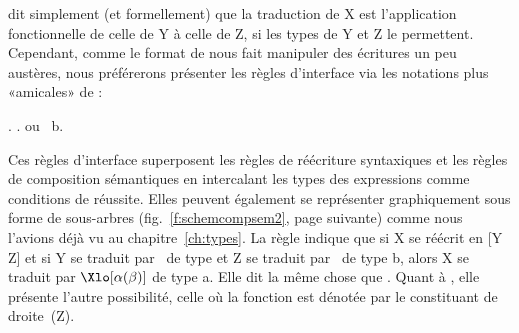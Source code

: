 {\Last} dit simplement (et formellement) que la traduction de X est l'application fonctionnelle de celle de Y à celle de Z, si les types de Y et Z le permettent.
Cependant, comme le format de {\Last} nous fait manipuler des écritures un peu austères, nous préférerons présenter les règles d'interface  via les  notations plus «amicales» de {\Next} :


\ex. \label{xRI1}
\a. 
\quad ou \
b.\hstrab[1.4em]


\sloppy

Ces règles d'interface superposent les règles de réécriture syntaxiques et les règles de composition sémantiques en intercalant les types des expressions comme conditions de réussite.  Elles peuvent également se représenter graphiquement sous forme de sous-arbres (fig.~\ref{f:schemcompsem2}, page suivante) comme nous l'avions déjà vu au chapitre~\ref{ch:types}.  La règle \Last[a]  indique que si X se réécrit en [Y Z] et si Y se traduit par \vrb\alpha\ de type  et Z se traduit par \vrb\beta\ de type \mtyp b, alors X se traduit par $\Xlo[\alpha(\beta)]$ de type \mtyp a.  Elle dit la même chose que \LLast.
Quant à \Last[b], elle présente l'autre possibilité, celle où la fonction est dénotée par le constituant de droite~(Z).

\fussy

